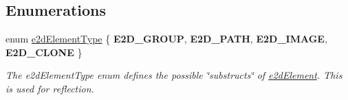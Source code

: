 \subsection*{Enumerations}
\begin{DoxyCompactItemize}
\item 
enum \hyperlink{group__e2dElement_ga9bc8cfdec08c7e9069fc707ee456fd38}{e2d\-Element\-Type} \{ {\bfseries E2\-D\-\_\-\-G\-R\-O\-U\-P}, 
{\bfseries E2\-D\-\_\-\-P\-A\-T\-H}, 
{\bfseries E2\-D\-\_\-\-I\-M\-A\-G\-E}, 
{\bfseries E2\-D\-\_\-\-C\-L\-O\-N\-E}
 \}
\begin{DoxyCompactList}\small\item\em The e2d\-Element\-Type enum defines the possible \char`\"{}substructs\char`\"{} of \hyperlink{structe2dElement}{e2d\-Element}. This is used for reflection. \end{DoxyCompactList}\end{DoxyCompactItemize}

